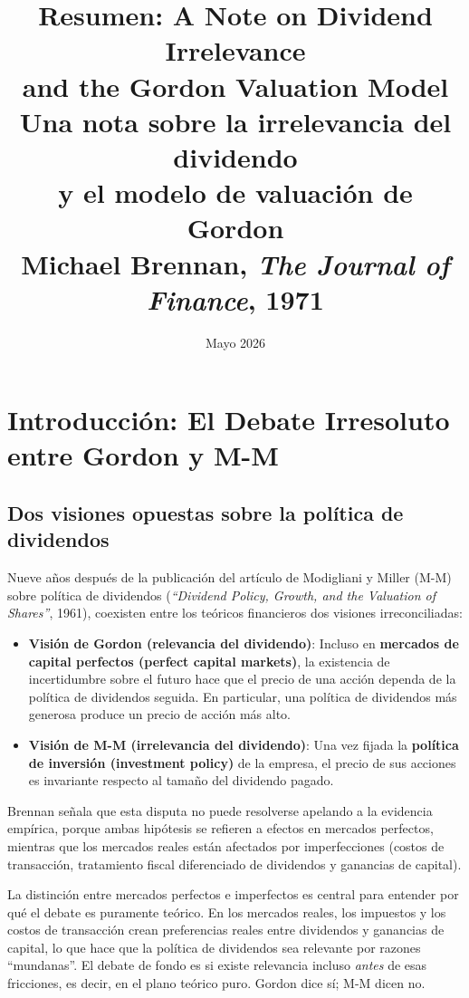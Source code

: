 \documentclass[12pt]{article}
\title{\textbf{Resumen: A Note on Dividend Irrelevance\\
and the Gordon Valuation Model}\\
\large Una nota sobre la irrelevancia del dividendo\\
y el modelo de valuaci\'on de Gordon\\
\normalsize Michael Brennan, \textit{The Journal of Finance}, 1971}
\author{}
\date{Mayo 2026}
\begin{document}
\maketitle
\tableofcontents
\newpage

\section{Introducci\'on: El Debate Irresoluto entre Gordon y M-M}

\subsection{Dos visiones opuestas sobre la pol\'itica de dividendos}

Nueve a\~nos despu\'es de la publicaci\'on del art\'iculo de Modigliani y Miller (M-M) sobre pol\'itica de dividendos (\textit{``Dividend Policy, Growth, and the Valuation of Shares''}, 1961), coexisten entre los te\'oricos financieros dos visiones irreconciliadas:

\begin{itemize}
  \item \textbf{Visi\'on de Gordon (relevancia del dividendo)}: Incluso en \textbf{mercados de capital perfectos (perfect capital markets)}, la existencia de incertidumbre sobre el futuro hace que el precio de una acci\'on dependa de la pol\'itica de dividendos seguida. En particular, una pol\'itica de dividendos m\'as generosa produce un precio de acci\'on m\'as alto.

  \item \textbf{Visi\'on de M-M (irrelevancia del dividendo)}: Una vez fijada la \textbf{pol\'itica de inversi\'on (investment policy)} de la empresa, el precio de sus acciones es invariante respecto al tama\~no del dividendo pagado.
\end{itemize}

Brennan se\~nala que esta disputa no puede resolverse apelando a la evidencia emp\'irica, porque ambas hip\'otesis se refieren a efectos en mercados perfectos, mientras que los mercados reales est\'an afectados por imperfecciones (costos de transacci\'on, tratamiento fiscal diferenciado de dividendos y ganancias de capital).

\begin{explicacion}
La distinci\'on entre mercados perfectos e imperfectos es central para entender por qu\'e el debate es puramente te\'orico. En los mercados reales, los impuestos y los costos de transacci\'on crean preferencias reales entre dividendos y ganancias de capital, lo que hace que la pol\'itica de dividendos sea relevante por razones ``mundanas''. El debate de fondo es si existe relevancia incluso \textit{antes} de esas fricciones, es decir, en el plano te\'orico puro. Gordon dice s\'i; M-M dicen no.
\end{explicacion}
\end{document}
